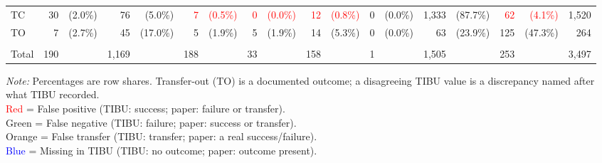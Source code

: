 {{\begin{tabular}{l|rr|rr|rr|rr|rr|rr|rr|rr|r}
TC & 30 & (2.0\%) & 76 & (5.0\%) & \textcolor{red}{7} & \textcolor{red}{(0.5\%)} & \textcolor{red}{0} & \textcolor{red}{(0.0\%)} & \textcolor{red}{12} & \textcolor{red}{(0.8\%)} & 0 & (0.0\%) & 1,333 & (87.7\%) & \textcolor{red}{62} & \textcolor{red}{(4.1\%)} & 1,520 \\
TO & 7 & (2.7\%) & \textcolor{orange!85!black}{45} & \textcolor{orange!85!black}{(17.0\%)} & \textcolor{orange!85!black}{5} & \textcolor{orange!85!black}{(1.9\%)} & \textcolor{orange!85!black}{5} & \textcolor{orange!85!black}{(1.9\%)} & \textcolor{orange!85!black}{14} & \textcolor{orange!85!black}{(5.3\%)} & 0 & (0.0\%) & \textcolor{orange!85!black}{63} & \textcolor{orange!85!black}{(23.9\%)} & 125 & (47.3\%) & 264 \\
\hline \\[-8pt]
Total & 190 &  & 1,169 &  & 188 &  & 33 &  & 158 &  & 1 &  & 1,505 &  & 253 &  & 3,497 \\
\hline \hline
\end{tabular}}}
\begin{minipage}{\wd\DQACrosstabBox}
\usebox{\DQACrosstabBox}
\par\vspace{4pt}\noindent
\textit{Note:} Percentages are row shares. Transfer-out (TO) is a documented outcome; a disagreeing TIBU value is a discrepancy named after what TIBU recorded. \\\textcolor{red}{Red} = False positive (TIBU: success; paper: failure or transfer). \\\textcolor{green!60!black}{Green} = False negative (TIBU: failure; paper: success or transfer). \\\textcolor{orange!85!black}{Orange} = False transfer (TIBU: transfer; paper: a real success/failure). \\\textcolor{blue}{Blue} = Missing in TIBU (TIBU: no outcome; paper: outcome present).
\end{minipage}